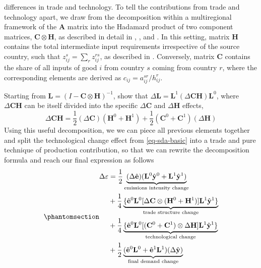 \documentclass[
  10pt,
  twocolumn]{aft}
\begin{document}
differences in trade and technology. To tell the contributions from
trade and technology apart, we draw from the decomposition within a
multiregional framework of the \(\mathbf{A}\) matrix into the Hadamard
product of two component matrices, \(\mathbf{C} \otimes \mathbf{H}\), as
described in detail in \citet{xuStructuralDecompositionAnalysis2014},
\citet{artoDriversGrowthGlobal2014}, and \citet{hoekstra_emission_2016}.
In this setting, matrix \(\mathbf{H}\) contains the total intermediate
input requirements irrespective of the source country, such that
\(z_{ij}^{s}=\sum_r z_{ij}^{rs}\), as described in
\citet{hoekstra_emission_2016}. Conversely, matrix \(\mathbf{C}\)
contains the share of all inputs of good \(i\) from country \(s\) coming
from country \(r\), where the corresponding elements are derived as
\(c_{ij}=a_{ij}^{sr}/h_{ij}^r\).

Starting from \(\mathbf{L}=(I - \mathbf{C} \otimes \mathbf{H})^{-1}\),
\citet[p.~607]{miller_input-output_2022} show that
\(\Delta \mathbf{L} = \mathbf{L}^1(\Delta \mathbf{C}\mathbf{H})\mathbf{L}^0\),
where \(\Delta \mathbf{C}\mathbf{H}\) can be itself divided into the
specific \(\Delta \mathbf{C}\) and \(\Delta \mathbf{H}\) effects,
\vspace{-3pt} \[
\Delta \mathbf{C}\mathbf{H}=\frac{1}{2}(\Delta \mathbf{C})(\mathbf{H}^0 + \mathbf{H}^1) + \frac{1}{2}(\mathbf{C}^0 + \mathbf{C}^1)(\Delta \mathbf{H})
\] Using this useful decomposition, we we can piece all previous
elements together and split the technological change effect from
\ref{eq-sda-basic} into a trade and pure technique of production
contribution, so that we can rewrite the decomposition formula and reach
our final expression as follows \vspace{-3pt}
\begin{equation}\phantomsection\label{eq-str-decomp}{
\begin{aligned}
\Delta \varepsilon&= \frac{1}{2}\underbrace{(\Delta \hat{\mathbf{e}})(\mathbf{L}^0\hat{\mathbf{y}}^0 + \mathbf{L}^1\hat{\mathbf{y}}^1)}_{\text{emissions intensity change}} \\ 
& + \frac{1}{4}\underbrace{ \lbrace \hat{\mathbf{e}}^0 \mathbf{L}^0 \lbrack \Delta \mathbf{C} \otimes (\mathbf{H}^0 + \mathbf{H}^1)  \rbrack \mathbf{L}^1 \hat{\mathbf{y}}^1 \rbrace }_{\text{trade structure change}} \\
& + \frac{1}{4}\underbrace{ \lbrace \hat{\mathbf{e}}^0 \mathbf{L}^0 \lbrack (\mathbf{C}^0 + \mathbf{C}^1) \otimes \Delta \mathbf{H} \rbrack \mathbf{L}^1 \hat{\mathbf{y}}^1 \rbrace }_{\text{technological change}} \\
& + \frac{1}{2}\underbrace{(\hat{\mathbf{e}}^0\mathbf{L}^0 + \hat{\mathbf{e}}^1\mathbf{L}^1)(\Delta \hat{\mathbf{y}})}_{\text{final demand change}}
\end{aligned}
}\end{equation}
\end{document}
